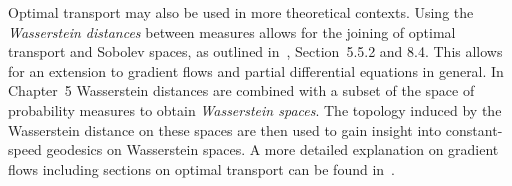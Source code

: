 Optimal transport may also be used in more theoretical contexts. Using the \textit{Wasserstein distances} between measures allows for the joining of optimal transport and Sobolev spaces, as outlined in~\cite{San2015}, Section~5.5.2 and 8.4. This allows for an extension to gradient flows and partial differential equations in general. In Chapter~5 Wasserstein distances are combined with a subset of the space of probability measures to obtain \textit{Wasserstein spaces}. The topology induced by the Wasserstein distance on these spaces are then used to gain insight into constant-speed geodesics on Wasserstein spaces. A more detailed explanation on gradient flows including sections on optimal transport can be found in~\cite{Ambr2005}. 